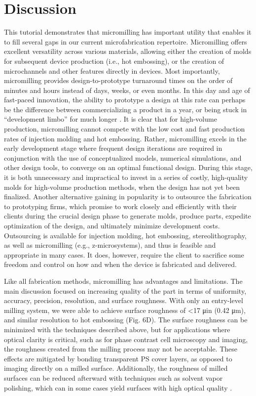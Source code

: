 {\section{Discussion}
This tutorial demonstrates that micromilling has important utility that enables it to fill several gaps in our current microfabrication repertoire. Micromilling offers excellent versatility across various materials, allowing either the creation of molds for subsequent device production (i.e., hot embossing), or the creation of microchannels and other features directly in devices. Most importantly, micromilling provides design-to-prototype turnaround times on the order of minutes and hours instead of days, weeks, or even months. In this day and age of fast-paced innovation, the ability to prototype a design at this rate can perhaps be the difference between commercializing a product in a year, or being stuck in “development limbo” for much longer \cite{Chin2012}. It is clear that for high-volume production, micromilling cannot compete with the low cost and fast production rates of injection molding and hot embossing. Rather, micromilling excels in the early development stage where frequent design iterations are required in conjunction with the use of conceptualized models, numerical simulations, and other design tools, to converge on an optimal functional design. During this stage, it is both unnecessary and impractical to invest in a series of costly, high-quality molds for high-volume production methods, when the design has not yet been finalized. Another alternative gaining in popularity is to outsource the fabrication to prototyping firms, which promise to work closely and efficiently with their clients during the crucial design phase to generate molds, produce parts, expedite optimization of the design, and ultimately minimize development costs. Outsourcing is available for injection molding, hot embossing, stereolithography, as well as micromilling (e.g., z-microsystems), and thus is feasible and appropriate in many cases. It does, however, require the client to sacrifice some freedom and control on how and when the device is fabricated and delivered. 

Like all fabrication methods, micromilling has advantages and limitations. The main discussion focused on increasing quality of the part in terms of uniformity, accuracy, precision, resolution, and surface roughness. With only an entry-level milling system, we were able to achieve surface roughness of <17 μin (0.42 μm), and similar resolution to hot embossing (Fig. 6D). The surface roughness can be minimized with the techniques described above, but for applications where optical clarity is critical, such as for phase contrast cell microscopy and imaging, the roughness created from the milling process may not be acceptable. These effects are mitigated by bonding transparent PS cover layers, as opposed to imaging directly on a milled surface. Additionally, the roughness of milled surfaces can be reduced afterward with techniques such as solvent vapor polishing, which can in some cases yield surfaces with high optical quality \cite{Ogilvie2010}.

}
